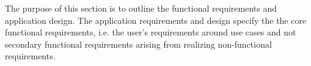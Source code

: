 The purpose of this section is to outline the functional requirements and application design. The application requirements and design specify the the core functional requirements, i.e. the user's requirements around use cases and not secondary functional requirements arising from realizing non-functional requirements.